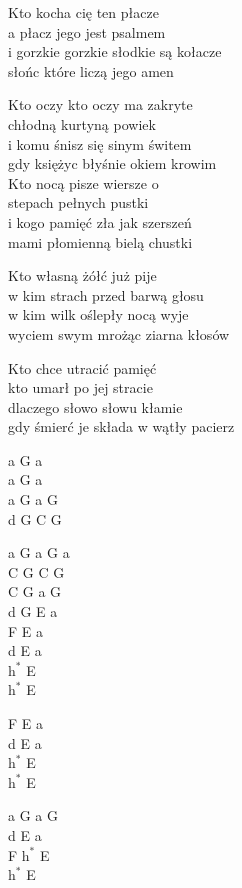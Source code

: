 \begin{text}
    Kto kocha cię ten płacze\\
    a płacz jego jest psalmem\\
    i gorzkie gorzkie słodkie są kołacze\\
    słońc które liczą jego amen

    Kto oczy kto oczy ma zakryte\\
    chłodną kurtyną powiek\\
    i komu śnisz się sinym świtem\\
    gdy księżyc błyśnie okiem krowim\\
    Kto nocą pisze wiersze o\\
    stepach pełnych pustki\\
    i kogo pamięć zła jak szerszeń\\
    mami płomienną bielą chustki

    Kto własną żółć już pije\\
    w kim strach przed barwą głosu\\
    w kim wilk oślepły nocą wyje\\
    wyciem swym mrożąc ziarna kłosów

    Kto chce utracić pamięć\\
    kto umarł po jej stracie\\
    dlaczego słowo słowu kłamie\\
    gdy śmierć je składa w wątły pacierz
\end{text}
\begin{chord}
    a G a\\
    a G a\\
    a G a G\\
    d G C G

    a G a G a\\
    C G C G\\
    C G a G\\
    d G E a\\
    F E a\\
    d E a\\
    $\mathrm{h^*}$ E\\
    $\mathrm{h^*}$ E

    F E a\\
    d E a\\
    $\mathrm{h^*}$ E\\
    $\mathrm{h^*}$ E

    a G a G\\
    d E a\\
    F $\mathrm{h^*}$ E\\
    $\mathrm{h^*}$ E
\end{chord}
